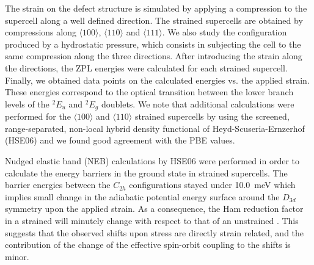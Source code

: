 	The strain on the defect structure is simulated by applying a compression to the supercell along a well defined direction. The strained supercells are obtained by compressions along $\langle 100 \rangle$, $\langle 110 \rangle$ and $\langle 111 \rangle$. We also study the configuration produced by a hydrostatic pressure, which consists in subjecting the cell to the same compression along the three directions. After introducing the strain along the directions, the ZPL energies were calculated for each strained supercell. Finally, we obtained data points on the calculated \ZPL energies vs. the applied strain. These \ZPL energies correspond to the optical transition between the lower branch levels of the ${}^{2}E_{u}$ and ${}^{2}E_{g}$ doublets. We note that additional calculations were performed for the  $\langle 100 \rangle$ and  $\langle 110 \rangle$ strained supercells by using the screened, range-separated, non-local hybrid density functional of Heyd-Scuseria-Ernzerhof (HSE06) \cite{heyd2003hybrid,krukau2006influence} and we found good agreement with the PBE values.

	Nudged elastic band (NEB) calculations \cite{henkelman2000climbing} by HSE06 were performed in order to calculate the energy barriers in the ground state in strained supercells. The barrier energies between the $C_{2h}$ configurations stayed under \SI{10.0}{\meV} which implies small change in the adiabatic potential energy surface around the $D_{3d}$ symmetry upon the applied strain. As a consequence, the Ham reduction factor in a strained \siv will minutely change with respect to that of an unstrained \siv \cite{thiering2018ab}. This suggests that the observed \ZPL shifts upon stress are directly strain related, and the contribution of the change of the effective spin-orbit coupling to the \ZPL shifts is minor.

